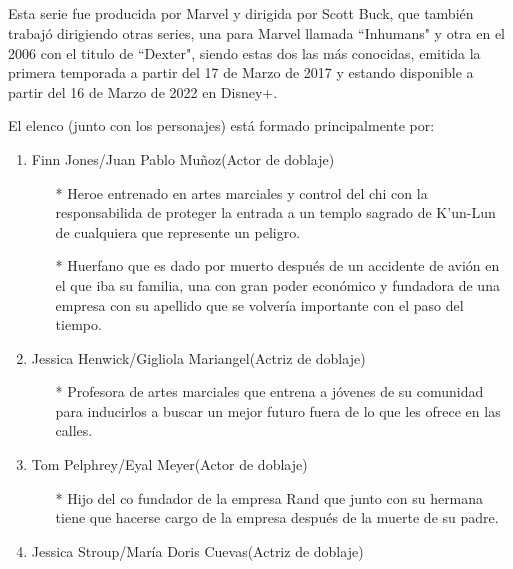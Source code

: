 \documentclass[a5paper, 11pt]{article}
\begin{document}
\subsection*{\color{red}{Detrás de Iron fist}}

Esta serie fue producida por Marvel y dirigida por Scott Buck, que también trabajó dirigiendo otras series, una para Marvel llamada ``Inhumans" y otra en el 2006 con el titulo de ``Dexter", siendo estas dos las más conocidas, emitida la primera temporada a partir del 17 de Marzo de 2017 y estando disponible a partir del 16 de Marzo de 2022 en Disney+.


El elenco (junto con los personajes) está formado principalmente por:
\begin{enumerate}
    \item Finn Jones/Juan Pablo Muñoz(Actor de doblaje) 
        \begin{itemize}
            \item[*] {} Heroe entrenado en artes marciales y control del chi con la responsabilida de proteger la entrada a un templo sagrado de K'un-Lun de cualquiera que represente un peligro.
            \item[*] {} Huerfano que es dado por muerto después de un accidente de avión en el que iba su familia, una con gran poder económico y fundadora de una empresa con su apellido que se volvería importante con el paso del tiempo.
            \end{itemize}
    \item Jessica Henwick/Gigliola Mariangel(Actriz de doblaje)
         \begin{itemize}
            \item[*] {}
            Profesora de artes marciales que entrena a jóvenes de su comunidad para inducirlos a buscar un mejor futuro fuera de lo que les ofrece en las calles.
            \end{itemize}
    \item Tom Pelphrey/Eyal Meyer(Actor de doblaje)
        \begin{itemize}
            \item[*] {}
            Hijo del co fundador de la empresa Rand que junto con su hermana tiene que hacerse cargo de la empresa después de la muerte de su padre.
            \end{itemize}
    \item Jessica Stroup/María Doris Cuevas(Actriz de doblaje)

\end{enumerate}
\end{document}
